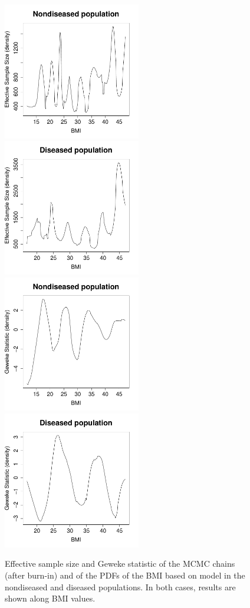 \begin{figure}[ht!]
\begin{center}
\includegraphics[width=6cm]{effective_sz_dpm_healthy.pdf}
\includegraphics[width=6cm]{effective_sz_dpm_diseased.pdf}\\
\includegraphics[width=6cm]{geweke_dpm_healthy.pdf}
\includegraphics[width=6cm]{geweke_dpm_diseased.pdf}
\end{center}
\caption{Effective sample size and  Geweke statistic of the MCMC chains (after burn-in) and of the PDFs of the BMI based on model  in the nondiseased and diseased populations. In both cases, results are shown along BMI values.}
\label{pROC_dpm_densities_es}
\end{figure}

